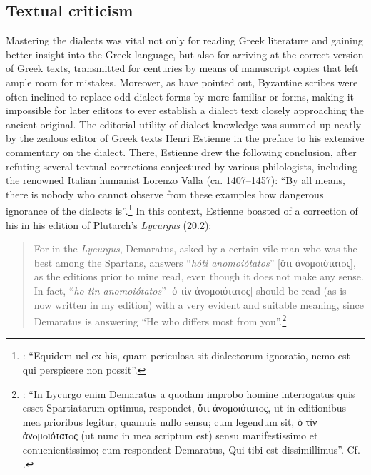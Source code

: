 \subsection{Textual criticism}

Mastering the dialects was vital not only for reading Greek literature and gaining better insight into the Greek language, but also for arriving at the correct version of Greek texts, transmitted for centuries by means of manuscript copies that left ample room for mistakes. Moreover, as \citet[47--48]{Reynolds1991} have pointed out, Byzantine scribes were often inclined to replace odd dialect forms by more familiar  or  forms, making it impossible for later editors to ever establish a dialect text closely approaching the ancient original. The editorial utility of dialect knowledge was summed up neatly by the zealous editor of Greek texts Henri Estienne in the preface to his extensive commentary on the  dialect. There, Estienne drew the following conclusion, after refuting several textual corrections conjectured by various philologists, including the renowned Italian humanist Lorenzo Valla (ca. 1407–1457): “By all means, there is nobody who cannot observe from these examples how dangerous ignorance of the dialects is”.\footnote{\citet[¶.iii\textsc{\textsuperscript{v}}]{Estienne1573}: “Equidem uel ex his, quam periculosa sit dialectorum ignoratio, nemo est qui perspicere non possit”.} In this context, Estienne boasted of a correction of his in his edition of Plutarch’s \textit{Lycurgus} (20.2):

\begin{quote}
For in the \textit{Lycurgus}, Demaratus, asked by a certain vile man who was the best among the Spartans, answers “\textit{hóti anomoiótatos}” [ὅτι ἀνoμoιότατoς], as the editions prior to mine read, even though it does not make any sense. In fact, “\textit{ho tìn anomoiótatos}” [ὁ τὶν ἀνoμoιότατoς] should be read (as is now written in my edition) with a very evident and suitable meaning, since Demaratus is answering “He who differs most from you”.\footnote{\citet[¶.iii\textsc{\textsuperscript{v}}]{Estienne1573}: “In Lycurgo enim Demaratus a quodam improbo homine interrogatus quis esset Spartiatarum optimus, respondet, ὅτι ἀνoμoιότατoς, ut in editionibus mea prioribus legitur, quamuis nullo sensu; cum legendum sit, ὁ τὶν ἀνoμoιότατoς (ut nunc in mea scriptum est) sensu manifestissimo et conuenientissimo; cum respondeat Demaratus, Qui tibi est dissimillimus”. Cf. \citet[36, 43–44]{Estienne1581}.}
\end{quote}

